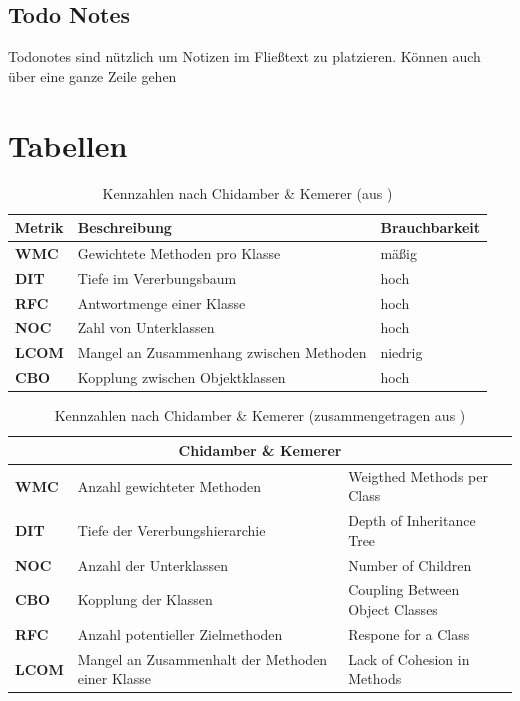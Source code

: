 \subsection{Todo Notes}
 Todonotes sind nützlich um Notizen im Fließtext zu platzieren. Können auch über eine ganze Zeile gehen

\section{Tabellen}
\blindtext
\begin{table}[h]
	\centering
	\begin{tabular}{|l|l|l|}
\hline 
		Metrik 		  &Beschreibung 								&  Brauchbarkeit\\ 
\hline  
		\textbf{WMC}  &Gewichtete Methoden pro Klasse 				&  mäßig 		\\ 
\hline  
		\textbf{DIT}  &Tiefe im Vererbungsbaum 						&  hoch 		\\ 
\hline  
		\textbf{RFC}  &Antwortmenge einer Klasse 					&  hoch 		\\ 
\hline 
		\textbf{NOC}  &Zahl von Unterklassen 						&  hoch 		\\ 
\hline  
		\textbf{LCOM} &Mangel an Zusammenhang zwischen Methoden 	&  niedrig  	\\ 
\hline  
		\textbf{CBO}  &Kopplung zwischen Objektklassen 				&  hoch  		\\ 
\hline 
	\end{tabular} 
	\caption{Kennzahlen nach Chidamber \& Kemerer (aus \cite{Prech1999})}
	\label{tab:metrik}
\end{table}


\begin{table}[h]
	\centering
	\begin{tabular}{lp{6cm}p{6cm}}
		\toprule
		\multicolumn{3}{c}{Chidamber \& Kemerer}\\ 
		\midrule
		\textbf{WMC}  &Anzahl gewichteter Methoden 				&  Weigthed Methods per Class 		\\ 
		\textbf{DIT}  &Tiefe der Vererbungshierarchie  			&  Depth of Inheritance Tree 		\\ 
		\textbf{NOC}  &Anzahl der Unterklassen 					&  Number of Children 				\\ 
		\textbf{CBO}  &Kopplung der Klassen 					&  Coupling Between Object Classes 	\\  
		\textbf{RFC}  &Anzahl potentieller Zielmethoden 		&  Respone for a Class  			\\  
		\textbf{LCOM} &Mangel an Zusammenhalt der Methoden
		 				einer Klasse 							&  Lack of Cohesion in Methods  		\\ 
		\bottomrule
	\end{tabular} 
	\caption{Kennzahlen nach Chidamber \& Kemerer (zusammengetragen aus \cite{Prech1999,Sneed2010,Chidamber1994})}
	\label{tab:ck}
\end{table}


